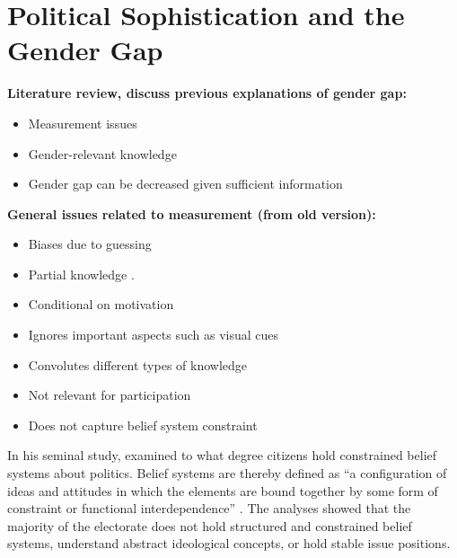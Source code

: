 \documentclass[12pt]{article}
\begin{document}
\section*{Political Sophistication and the Gender Gap}

\noindent \textbf{Literature review, discuss previous explanations of gender gap:}
\begin{itemize}\singlespacing
\item Measurement issues \citep[e.g.][]{mondak2004knowledge}
\item Gender-relevant knowledge \citep[e.g.][]{dolan2011women}
\item Gender gap can be decreased given sufficient information \citep[e.g.][]{jerit2017revisiting}
\end{itemize}

\noindent \textbf{General issues related to measurement (from old version):}
\begin{itemize}\singlespacing
   \item Biases due to guessing \citep[e.g.][]{mondak2004knowledge}
   \item Partial knowledge \citep[e.g.][]{debell2013harder}.
   \item Conditional on motivation \citep[e.g.][]{prior2008money}
   \item Ignores important aspects such as visual cues \citep{prior2014visual}
   \item Convolutes different types of knowledge \citep{barabas2014question}
   \item Not relevant for participation \citep{lupia2006elitism}
   \item Does not capture belief system constraint \citep{luskin1987measuring,tetlock1983cognitive}
\end{itemize}

In his seminal study, \citet{converse1964nature} examined to what degree citizens hold constrained belief systems about politics. Belief systems are thereby defined as ``a configuration of ideas and attitudes in which the elements are bound together by some form of constraint or functional interdependence'' \citep[207]{converse1964nature}. The analyses showed that the majority of the electorate does not hold structured and constrained belief systems, understand abstract ideological concepts, or hold stable issue positions. 
\end{document}
